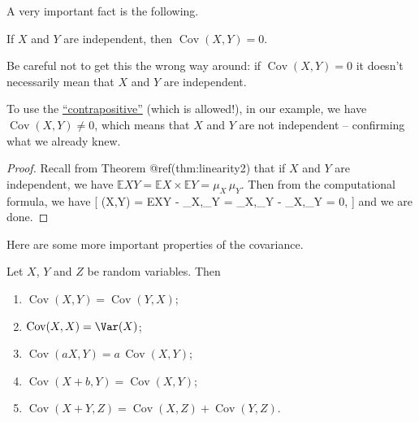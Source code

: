 \documentclass[
  letterpaper,
  DIV=11,
  numbers=noendperiod]{scrreprt}
\providecommand{\tightlist}{%
  \setlength{\itemsep}{0pt}\setlength{\parskip}{0pt}}\usepackage{longtable,booktabs,array}
\theoremstyle{remark}
\begin{document}
A very important fact is the following.

If \(X\) and \(Y\) are independent, then
\(\operatorname{Cov}(X,Y) = 0\).

Be careful not to get this the wrong way around: if
\(\operatorname{Cov}(X,Y) = 0\) it doesn't necessarily mean that \(X\)
and \(Y\) are independent.

To use the
\href{https://www.varsitytutors.com/hotmath/hotmath_help/topics/converse-inverse-contrapositive}{``contrapositive''}
(which is allowed!), in our example, we have
\(\operatorname{Cov}(X,Y) \neq 0\), which means that \(X\) and \(Y\) are
not independent -- confirming what we already knew.

\begin{proof}

Recall from Theorem @ref(thm:linearity2) that if \(X\) and \(Y\) are
independent, we have
\(\mathbb EXY = \mathbb EX \times \mathbb EY = \mu_X \, \mu_Y\). Then
from the computational formula, we have {[} (X,Y) =
\mathbb EXY - \mu\_X,\mu\_Y = \mu\_X,\mu\_Y - \mu\_X,\mu\_Y = 0, {]} and
we are done.

\end{proof}

Here are some more important properties of the covariance.

Let \(X\), \(Y\) and \(Z\) be random variables. Then

\begin{enumerate}
\def\labelenumi{\arabic{enumi}.}
\tightlist
\item
  \(\operatorname{Cov}(X,Y) = \operatorname{Cov}(Y,X)\);
\item
  \(\operatorname{Cov}(X,X) = \Var(X)\);
\item
  \(\operatorname{Cov}(aX, Y) = a\,\operatorname{Cov}(X,Y)\);
\item
  \(\operatorname{Cov}(X + b, Y) = \operatorname{Cov}(X,Y)\);
\item
  \(\operatorname{Cov}(X + Y, Z) = \operatorname{Cov}(X, Z) + \operatorname{Cov}(Y,Z)\).
\end{enumerate}
\end{document}
